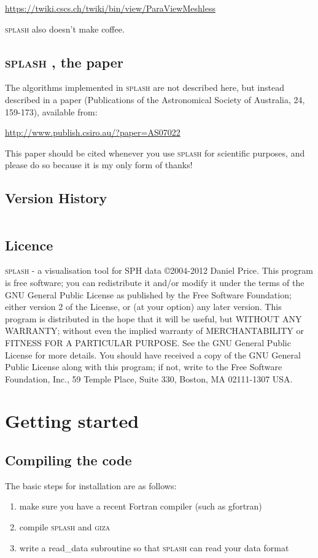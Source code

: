 \documentclass[a4paper,10pt]{article}
\def\thisyear{2012 }
\newcommand{\splash}{\textsc{splash }}
\newcommand{\giza}{\textsc{giza }}
\begin{document}
\url{https://twiki.cscs.ch/twiki/bin/view/ParaViewMeshless}

 \splash also doesn't make coffee.

\subsection{\splash, the paper}
 The algorithms implemented in \splash are not described here, but instead described in a paper \citep{splashpaper} (Publications of the Astronomical Society of Australia, 24, 159-173), available from:

\url{http://www.publish.csiro.au/?paper=AS07022}

\noindent This paper should be cited whenever you use \splash for scientific purposes, and please do so because it is my only form of thanks!

\subsection{Version History}

\begin{longtable}{|l|l|p{}|}
\hline

\hline
\end{longtable}

\subsection{Licence}
\splash - a visualisation tool for SPH data \copyright 2004-\thisyear  Daniel Price.
 This program is free software; you can redistribute it and/or modify it under the terms of the GNU General Public License as published by the Free Software Foundation; either version 2 of the License, or (at your option) any later version. This program is distributed in the hope that it will be useful, but WITHOUT ANY WARRANTY; without even the implied warranty of MERCHANTABILITY or FITNESS FOR A PARTICULAR PURPOSE.  See the GNU General Public License for more details. You should have received a copy of the GNU General Public License along with this program; if not, write to the Free Software Foundation, Inc., 59 Temple Place, Suite 330, Boston, MA  02111-1307  USA.

\section{Getting started}%
\subsection{Compiling the code}
The basic steps for installation are as follows:
\begin{enumerate}
\item make sure you have a recent Fortran compiler (such as gfortran)
\item compile \splash and \giza
\item write a read\_data subroutine so that \splash can read your data format
\end{enumerate}
\end{document}
